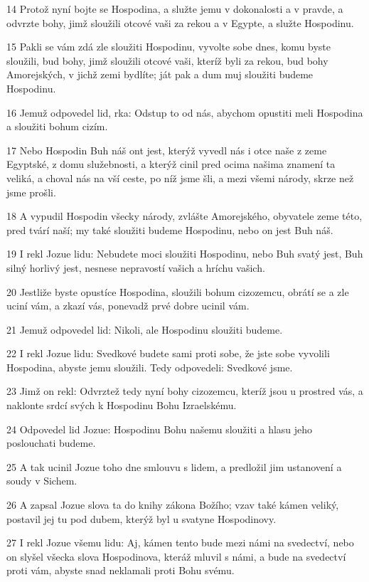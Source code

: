 \par 14 Protož nyní bojte se Hospodina, a služte jemu v dokonalosti a v pravde, a odvrzte bohy, jimž sloužili otcové vaši za rekou a v Egypte, a služte Hospodinu.
\par 15 Pakli se vám zdá zle sloužiti Hospodinu, vyvolte sobe dnes, komu byste sloužili, bud bohy, jimž sloužili otcové vaši, kteríž byli za rekou, bud bohy Amorejských, v jichž zemi bydlíte; ját pak a dum muj sloužiti budeme Hospodinu.
\par 16 Jemuž odpovedel lid, rka: Odstup to od nás, abychom opustiti meli Hospodina a sloužiti bohum cizím.
\par 17 Nebo Hospodin Buh náš ont jest, kterýž vyvedl nás i otce naše z zeme Egyptské, z domu služebnosti, a kterýž cinil pred ocima našima znamení ta veliká, a choval nás na vší ceste, po níž jsme šli, a mezi všemi národy, skrze než jsme prošli.
\par 18 A vypudil Hospodin všecky národy, zvlášte Amorejského, obyvatele zeme této, pred tvárí naší; my také sloužiti budeme Hospodinu, nebo on jest Buh náš.
\par 19 I rekl Jozue lidu: Nebudete moci sloužiti Hospodinu, nebo Buh svatý jest, Buh silný horlivý jest, nesnese nepravostí vašich a hríchu vašich.
\par 20 Jestliže byste opustíce Hospodina, sloužili bohum cizozemcu, obrátí se a zle uciní vám, a zkazí vás, ponevadž prvé dobre ucinil vám.
\par 21 Jemuž odpovedel lid: Nikoli, ale Hospodinu sloužiti budeme.
\par 22 I rekl Jozue lidu: Svedkové budete sami proti sobe, že jste sobe vyvolili Hospodina, abyste jemu sloužili. Tedy odpovedeli: Svedkové jsme.
\par 23 Jimž on rekl: Odvrztež tedy nyní bohy cizozemcu, kteríž jsou u prostred vás, a naklonte srdcí svých k Hospodinu Bohu Izraelskému.
\par 24 Odpovedel lid Jozue: Hospodinu Bohu našemu sloužiti a hlasu jeho poslouchati budeme.
\par 25 A tak ucinil Jozue toho dne smlouvu s lidem, a predložil jim ustanovení a soudy v Sichem.
\par 26 A zapsal Jozue slova ta do knihy zákona Božího; vzav také kámen veliký, postavil jej tu pod dubem, kterýž byl u svatyne Hospodinovy.
\par 27 I rekl Jozue všemu lidu: Aj, kámen tento bude mezi námi na svedectví, nebo on slyšel všecka slova Hospodinova, kteráž mluvil s námi, a bude na svedectví proti vám, abyste snad neklamali proti Bohu svému.

